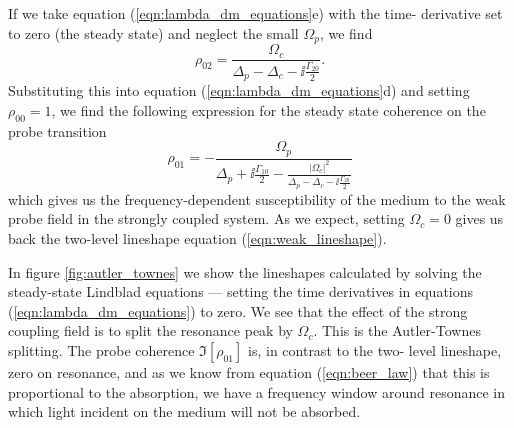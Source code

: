     If we take equation (\ref{eqn:lambda_dm_equations}e) with the time-
    derivative set to zero (\ie the steady state) and neglect the small
    $\Omega_p$, we find
    \begin{equation}
      \rho_{02} = \frac{\Omega_c}{\Delta_p - \Delta_c 
      - \ii \tfrac{\Gamma_{20}}{2}}.
    \end{equation}
    Substituting this into equation (\ref{eqn:lambda_dm_equations}d) and setting
    $\rho_{00} = 1$, we find the following expression for the steady state
    coherence on the probe transition
    \begin{equation}
      \rho_{01} = - \frac{\Omega_p}{\Delta_p + \ii \tfrac{\Gamma_{10}}{2} - 
      \frac{\left| \Omega_c \right|^2 }{\Delta_p - \Delta_c - 
      \ii \tfrac{\Gamma_{20}}{2}}}
    \end{equation}
    which gives us the frequency-dependent susceptibility of the medium to the
    weak probe field in the strongly coupled system. As we expect, setting
    $\Omega_c = 0$ gives us back the two-level lineshape equation
    (\ref{eqn:weak_lineshape}).

    In figure \ref{fig:autler_townes} we show the lineshapes calculated by
    solving the steady-state Lindblad equations --- \ie setting the time
    derivatives in equations (\ref{eqn:lambda_dm_equations}) to zero. We see
    that the effect of the strong coupling field is to split the resonance peak
    by $\Omega_c$. This is the Autler-Townes splitting\cite{Autler1955}. The
    probe coherence $\Im \left[ \rho_{01} \right]$ is, in contrast to the two-
    level lineshape, zero on resonance, and as we know from equation
    (\ref{eqn:beer_law}) that this is proportional to the absorption, we have a
    frequency window around resonance in which light incident on the medium will
    not be absorbed.

